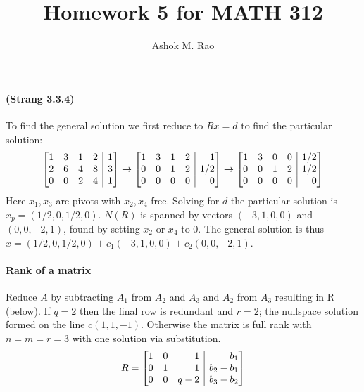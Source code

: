 \documentclass[10pt]{article}
\title{Homework 5 for MATH 312}
\author{Ashok M. Rao}
\makeatletter
\newenvironment{sysmatrix}[1]
 {\left[\begin{array}{@{}#1@{}}}
 {\end{array}\right]}
\makeatother
\begin{document}
\maketitle
{}

\paragraph{(Strang 3.3.4)}
To find the general solution we first reduce to $Rx=d$ to find the particular solution:
\[
\begin{sysmatrix}{rrrr|r}
1& 3& 1& 2& 1\\
2& 6& 4& 8& 3\\
0& 0& 2& 4& 1
\end{sysmatrix}\rightarrow
\begin{sysmatrix}{rrrr|r}
1& 3& 1& 2& 1\\
0& 0& 1& 2& 1/2\\
0& 0& 0& 0& 0
\end{sysmatrix}\rightarrow
\begin{sysmatrix}{rrrr|r}
1& 3& 0& 0& 1/2\\
0& 0& 1& 2& 1/2\\
0& 0& 0& 0& 0
\end{sysmatrix}
\]
Here $x_1, x_3$ are pivots with $x_2, x_4$ free.  Solving for $d$ the particular solution is $x_p = (1/2, 0, 1/2, 0)$. $N(R)$ is spanned by vectors $(-3, 1, 0, 0)$ and $(0, 0, -2, 1)$, found by setting $x_2$ or $x_4$ to 0. The general solution is thus $x = (1/2, 0, 1/2, 0) + c_1(-3,1,0,0) + c_2(0,0,-2,1)$.

\paragraph{Rank of a matrix}
Reduce $A$ by subtracting $A_1$ from $A_2$ and $A_3$ and $A_2$ from $A_3$ resulting in R (below). If $q=2$ then the final row is redundant and $r=2$; the nullspace solution formed on the line $c(1,1,-1)$. Otherwise the matrix is full rank with $n=m=r=3$ with one solution via substitution.
\[R =\begin{sysmatrix}{rrr|r}
	1& 0& 1& b_1\\
	0& 1& 1& b_2-b_1\\
	0& 0& q-2& b_3-b_2
\end{sysmatrix}\]
\end{document}
